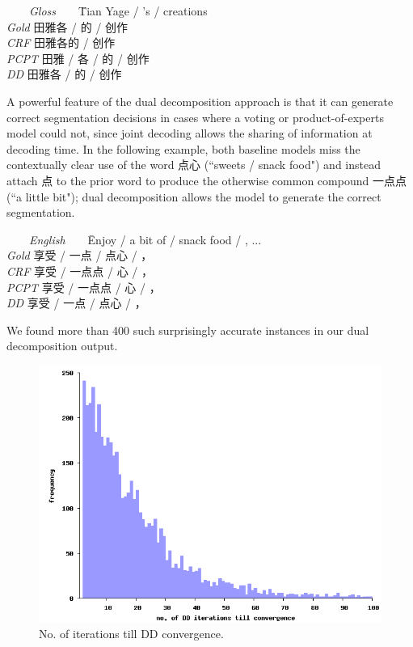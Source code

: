 \begin{small}
\begin{tabbing}
\ \ \ \ \= \emph{Gloss}\ \ \ \ \= Tian Yage / 's / creations \\
\> \emph{Gold} \>   田雅各 / 的 / 创作 \\
\> \emph{CRF} \>  田雅各的 / 创作 \\
\> \emph{PCPT} \>  田雅 / 各 / 的 / 创作 \\
\> \emph{DD} \>  田雅各 / 的 / 创作 \\
\end{tabbing}
\end{small}

A powerful feature of the dual decomposition approach is that it can generate correct segmentation decisions in cases where a voting or product-of-experts model could not, since joint decoding allows the sharing of information at decoding time. In the following example, both baseline models miss the contextually clear use of the word 点心 (``sweets / snack food") and instead attach 点 to the prior word to produce the otherwise common compound 一点点 (``a little bit"); dual decomposition allows the model to generate the correct segmentation.
\begin{small}
\begin{tabbing}
\ \ \ \ \= \emph{English}\ \ \ \ \= Enjoy / a bit of / snack food / , ... \\
\> \emph{Gold} \>  享受 / 一点 / 点心 /  ，\\
\> \emph{CRF} \> 享受 / 一点点 / 心 / ，\\
\> \emph{PCPT} \> 享受 / 一点点 / 心 / ， \\
\> \emph{DD} \>  享受 / 一点 / 点心 / ，\\
\end{tabbing}
\end{small}
We found more than 400 such surprisingly accurate instances in our dual decomposition output.


\begin{figure}
\begin{center}
\includegraphics[width=\columnwidth]{histogram.png}
\caption{No. of iterations till DD convergence.}
\label{fig:histo}
\end{center}
\end{figure}



%
%
%
